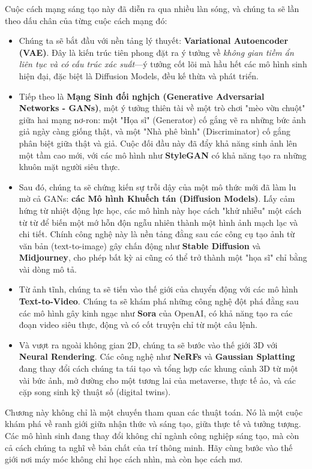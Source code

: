 Cuộc cách mạng sáng tạo này đã diễn ra qua nhiều làn sóng, và chúng ta sẽ lần theo dấu chân của từng cuộc cách mạng đó:
\begin{itemize}
	\item Chúng ta sẽ bắt đầu với nền tảng lý thuyết: \textbf{Variational Autoencoder (VAE)}. Đây là kiến trúc tiên phong đặt ra ý tưởng về \textit{không gian tiềm ẩn liên tục và có cấu trúc xác suất}—ý tưởng cốt lõi mà hầu hết các mô hình sinh hiện đại, đặc biệt là Diffusion Models, đều kế thừa và phát triển.

	\item Tiếp theo là \textbf{Mạng Sinh đối nghịch (Generative Adversarial Networks - GANs)}, một ý tưởng thiên tài về một trò chơi "mèo vờn chuột" giữa hai mạng nơ-ron: một "Họa sĩ" (Generator) cố gắng vẽ ra những bức ảnh giả ngày càng giống thật, và một "Nhà phê bình" (Discriminator) cố gắng phân biệt giữa thật và giả. Cuộc đối đầu này đã đẩy khả năng sinh ảnh lên một tầm cao mới, với các mô hình như \textbf{StyleGAN} có khả năng tạo ra những khuôn mặt người siêu thực.

	\item Sau đó, chúng ta sẽ chứng kiến sự trỗi dậy của một mô thức mới đã làm lu mờ cả GANs: \textbf{các Mô hình Khuếch tán (Diffusion Models)}. Lấy cảm hứng từ nhiệt động lực học, các mô hình này học cách "khử nhiễu" một cách từ từ để biến một mớ hỗn độn ngẫu nhiên thành một hình ảnh mạch lạc và chi tiết. Chính công nghệ này là nền tảng đằng sau các công cụ tạo ảnh từ văn bản (text-to-image) gây chấn động như \textbf{Stable Diffusion} và \textbf{Midjourney}, cho phép bất kỳ ai cũng có thể trở thành một "họa sĩ" chỉ bằng vài dòng mô tả.
	
	\item Từ ảnh tĩnh, chúng ta sẽ tiến vào thế giới của chuyển động với các mô hình \textbf{Text-to-Video}. Chúng ta sẽ khám phá những công nghệ đột phá đằng sau các mô hình gây kinh ngạc như \textbf{Sora} của OpenAI, có khả năng tạo ra các đoạn video siêu thực, động và có cốt truyện chỉ từ một câu lệnh.
	
	\item Và vượt ra ngoài không gian 2D, chúng ta sẽ bước vào thế giới 3D với \textbf{Neural Rendering}. Các công nghệ như \textbf{NeRFs} và \textbf{Gaussian Splatting} đang thay đổi cách chúng ta tái tạo và tổng hợp các khung cảnh 3D từ một vài bức ảnh, mở đường cho một tương lai của metaverse, thực tế ảo, và các cặp song sinh kỹ thuật số (digital twins).
\end{itemize}

Chương này không chỉ là một chuyến tham quan các thuật toán. Nó là một cuộc khám phá về ranh giới giữa nhận thức và sáng tạo, giữa thực tế và tưởng tượng. Các mô hình sinh đang thay đổi không chỉ ngành công nghiệp sáng tạo, mà còn cả cách chúng ta nghĩ về bản chất của trí thông minh. Hãy cùng bước vào thế giới nơi máy móc không chỉ học cách nhìn, mà còn học cách mơ.